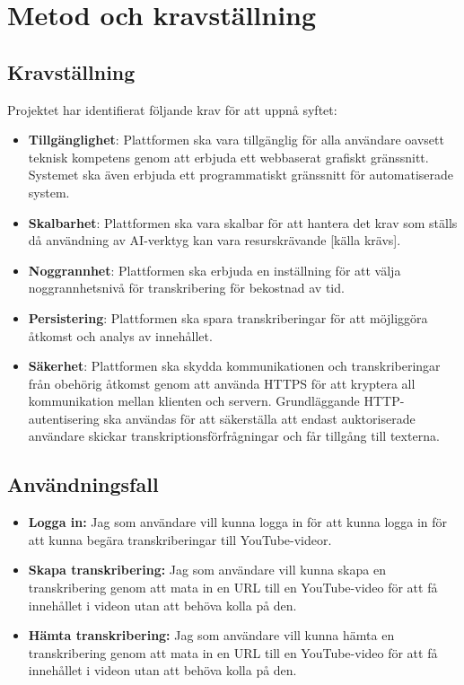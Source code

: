 \section{Metod och kravställning}
\label{sec:method-and-requirements}

\subsection{Kravställning}
\label{sec:requirements}
Projektet har identifierat följande krav för att uppnå syftet:
\begin{itemize}
    \item \textbf{Tillgänglighet}: Plattformen ska vara tillgänglig för alla
    användare oavsett teknisk kompetens genom att erbjuda ett webbaserat
    grafiskt gränssnitt. Systemet ska även erbjuda ett programmatiskt
    gränssnitt för automatiserade system.
    \item \textbf{Skalbarhet}: Plattformen ska vara skalbar för att hantera
    det krav som ställs då användning av AI-verktyg kan vara resurskrävande
    [källa krävs].
    \item \textbf{Noggrannhet}: Plattformen ska erbjuda en inställning för att
    välja noggrannhetsnivå för transkribering för bekostnad av tid.
    \item \textbf{Persistering}: Plattformen ska spara transkriberingar för
    att möjliggöra åtkomst och analys av innehållet.
    \item \textbf{Säkerhet}: Plattformen ska skydda kommunikationen och
    transkriberingar från obehörig åtkomst genom att använda HTTPS för att
    kryptera all kommunikation mellan klienten och servern. Grundläggande
    HTTP-autentisering ska användas för att säkerställa att endast
    auktoriserade användare skickar transkriptionsförfrågningar och får
    tillgång till texterna.
\end{itemize}

\subsection{Användningsfall}
\label{sec:use-cases}

\begin{itemize}
    \item \textbf{Logga in:} Jag som användare vill kunna logga in för att
    kunna logga in för att kunna begära transkriberingar till YouTube-videor.
    \item \textbf{Skapa transkribering:} Jag som användare vill kunna skapa en
    transkribering genom att mata in en URL till en YouTube-video för att få
    innehållet i videon utan att behöva kolla på den.
    \item \textbf{Hämta transkribering:} Jag som användare vill kunna hämta en
    transkribering genom att mata in en URL till en YouTube-video för att få
    innehållet i videon utan att behöva kolla på den.
\end{itemize}

